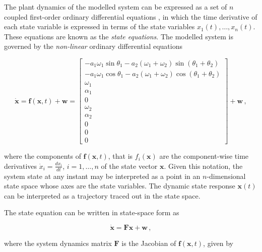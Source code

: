 The plant dynamics of the modelled system can be expressed as a set of $n$ coupled first-order ordinary differential equations \cite{rowell2002state}, in which the time derivative of each state variable is expressed in terms of the state variables $x_1(t), \dots, x_n(t)$. These equations are known as the \emph{state equations}. The modelled system is governed by the \emph{non-linear} ordinary differential equations

\begin{equation} \label{eq:state_vector_derivative}
  \dot{\mathbf{x}} = \mathbf{f}(\mathbf{x}, t) + \mathbf{w} = \left[\begin{smallmatrix}
  -a_1 \omega_1 \sin \theta_1  - a_2 (\omega_1 + \omega_2) \sin(\theta_1 + \theta_2) \\
  -a_1 \omega_1 \cos \theta_1  - a_2 (\omega_1 + \omega_2) \cos(\theta_1 + \theta_2) \\ \omega_1 \\ \alpha_1 \\ 0 \\ \omega_2 \\ \alpha_2 \\ 0 \\ 0 \\ 0
  \end{smallmatrix}\right] + \mathbf{w}\,,
\end{equation}

\noindent
where the components of $\mathbf{f}(\mathbf{x},t)$, that is $f_i(\mathbf{x})$ are the component-wise time derivatives $\dot{x}_i = \frac{dx_i}{dt}$, $i = 1, \dots, n$ of the state vector $\mathbf{x}$. Given this notation, the system state at any instant may be interpreted as a point in an $n$-dimensional state space whose axes are the state variables. The dynamic state response $\mathbf{x}(t)$ can be interpreted as a trajectory traced out in the state space.

The state equation can be written in state-space form as 

\begin{equation}
  \dot{\mathbf{x}} = \mathbf{F} \mathbf{x} + \mathbf{w}\,,
\end{equation}

\noindent
where the system dynamics matrix $\mathbf{F}$ is the Jacobian of $\mathbf{f}(\mathbf{x},t)$, given by

